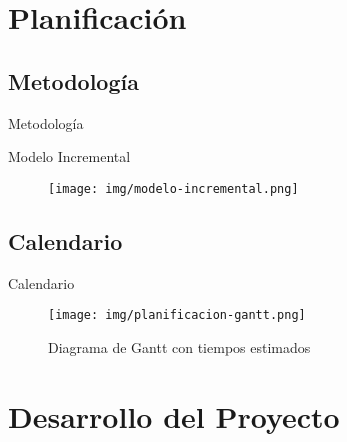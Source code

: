 \documentclass[spanish,xcolor=table,svgnames]{beamer}
\begin{document}
\section{Planificación}

\subsection*{Metodologí­a}
\begin{frame}{Metodologí­a}
    \begin{center}
    Modelo Incremental
    \begin{figure}[H]
      \begin{center}
          \texttt{[image: img/modelo-incremental.png]}
      \end{center}
      \label{fig:modelo-incremental}
    \end{figure}
  \end{center}
\end{frame}

\subsection*{Calendario}
\begin{frame}{Calendario}
  \begin{center}
    \begin{figure}[H]
      \begin{center}
          \texttt{[image: img/planificacion-gantt.png]}
      \end{center}
      \caption{Diagrama de Gantt con tiempos estimados}
      \label{fig:gantt}
    \end{figure}
  \end{center}
\end{frame}


\section{Desarrollo del Proyecto}
\end{document}
